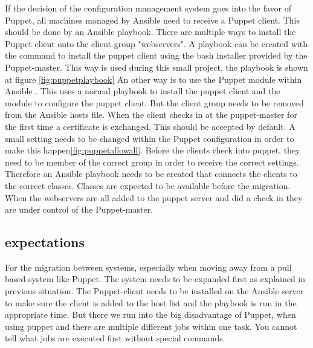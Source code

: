 If the decision of the configuration management system goes into the favor of Puppet, all machines managed by Ansible need to receive a Puppet client. This should be done by an Ansible playbook. There are multiple ways to install the Puppet client onto the client group "webservers". A playbook can be created with the command to install the puppet client using the bash installer provided by the Puppet-master. This way is used during this small project, the playbook is shown at figure \ref{fig:puppetplaybook} An other way is to use the Puppet module within Ansible \cite{ansiblepuppet}. This uses a normal playbook to install the puppet client and the module to configure the puppet client. But the client group needs to be removed from the Ansible hosts file. When the client checks in at the puppet-master for the first time a certificate is exchanged. This should be accepted by default. A small setting needs to be changed within the Puppet configuration in order to make this happen\ref{fig:puppetallowall}. Before the clients check into puppet, they need to be member of the correct group in order to receive the correct settings. Therefore an Ansible playbook needs to be created that connects the clients to the correct classes. Classes are expected to be available before the migration. When the webservers are all added to the puppet server and did a check in they are under control of the Puppet-master.

\subsection{expectations}\label{subsec:expectations}
For the migration between systems, especially when moving away from a pull based system like Puppet. The system needs to be expanded first as explained in previous situation. The Puppet-client needs to be installed on the Ansible server to make sure the client is added to the host list and the playbook is run in the appropriate time. But there we run into the big disadvantage of Puppet, when using puppet and there are multiple different jobs within one task. You cannot tell what jobs are executed first without special commands.  

